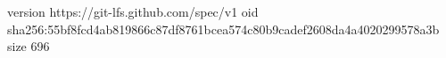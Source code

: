 version https://git-lfs.github.com/spec/v1
oid sha256:55bf8fcd4ab819866c87df8761bcea574c80b9cadef2608da4a4020299578a3b
size 696

